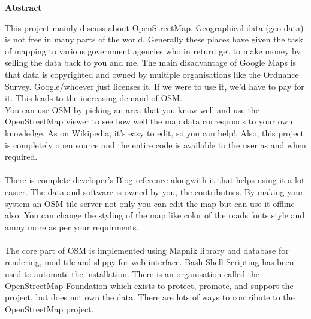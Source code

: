 \begin{center}
{\Huge \bf{Abstract}\vskip 0.2in}
\end{center}

This project mainly discuss about OpenStreetMap. Geographical data (geo data) is not free in many parts of the world. Generally these places have given the task of mapping to various government agencies who in return get to make money by selling the data back to you and me. The main disadvantage of Google Maps is that data is copyrighted and owned by multiple organisations like the Ordnance Survey. Google/whoever just licenses it. If we were to use it, we'd have to pay for it. This leads to the increasing demand of OSM.\\

You can use OSM by picking an area that you know well and use the OpenStreetMap viewer to see how well the map data corresponds to your own knowledge. As on Wikipedia, it's easy to edit, so you can help!. Also, this project is completely open source and the entire code is available
to the user as and when required.\\\\
There is complete developer's
Blog reference alongwith it that helps using it a lot easier. The data and software is owned by you, the contributors.
By making your system an OSM tile server not only you can edit the map but can use it
offline also. You can change the styling of the map like color of the roads fonts style and amny
more as per your requirments.\\\\
The core part of OSM is implemented using Mapnik library and database for rendering,
mod tile and slippy for web interface. Bash Shell Scripting has been used to automate the
installation.
There is an organisation called the OpenStreetMap Foundation which exists to protect, promote, and support the project, but does not own the data. There are lots of ways to contribute to the OpenStreetMap project.\\ 
